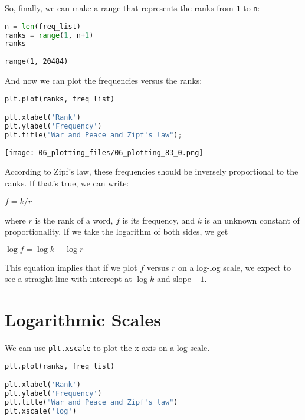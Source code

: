 \pagebreak

So, finally, we can make a range that represents the ranks from
\passthrough{\lstinline!1!} to \passthrough{\lstinline!n!}:

\begin{lstlisting}[language=Python,style=source]
n = len(freq_list)
ranks = range(1, n+1)
ranks
\end{lstlisting}

\begin{lstlisting}[style=output]
range(1, 20484)
\end{lstlisting}

And now we can plot the frequencies versus the ranks:

\begin{lstlisting}[language=Python,style=source]
plt.plot(ranks, freq_list)

plt.xlabel('Rank')
plt.ylabel('Frequency')
plt.title("War and Peace and Zipf's law");
\end{lstlisting}

\begin{center}
\texttt{[image: 06\_plotting\_files/06\_plotting\_83\_0.png]}
\end{center}

According to Zipf's law, these frequencies should be inversely
proportional to the ranks. If that's true, we can write:

\(f = k / r\)

where \(r\) is the rank of a word, \(f\) is its frequency, and \(k\) is
an unknown constant of proportionality. If we take the logarithm of both
sides, we get

\(\log f = \log k - \log r\)

This equation implies that if we plot \(f\) versus \(r\) on a log-log
scale, we expect to see a straight line with intercept at \(\log k\) and
slope \(-1\).

\section{Logarithmic Scales}\label{logarithmic-scales}

We can use \passthrough{\lstinline!plt.xscale!} to plot the x-axis on a
log scale.

\begin{lstlisting}[language=Python,style=source]
plt.plot(ranks, freq_list)

plt.xlabel('Rank')
plt.ylabel('Frequency')
plt.title("War and Peace and Zipf's law")
plt.xscale('log')
\end{lstlisting}

